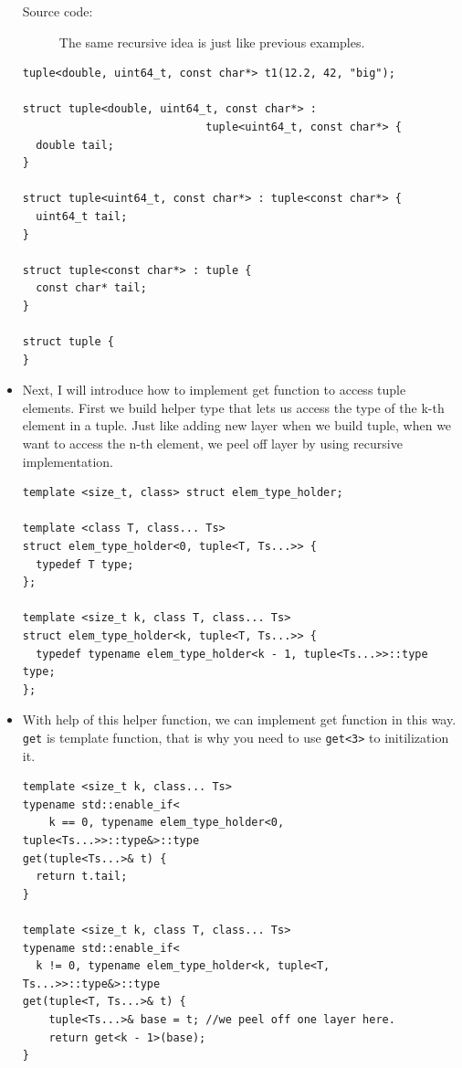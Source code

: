 \documentclass[a4paper,11pt,twoside]{book}
\begin{document}
\begin{itemize}
\begin{description}
	\item[Source code:] The same recursive idea is just like previous examples.
\end{description}

\begin{lstlisting}
tuple<double, uint64_t, const char*> t1(12.2, 42, "big");

struct tuple<double, uint64_t, const char*> : 
							tuple<uint64_t, const char*> {
  double tail;
}

struct tuple<uint64_t, const char*> : tuple<const char*> {
  uint64_t tail;
}

struct tuple<const char*> : tuple {
  const char* tail;
}

struct tuple {
}
\end{lstlisting}

    \item Next, I will introduce how to implement get function to access tuple elements. First we build helper type that lets us access the type of the k-th element in a tuple. Just like adding new layer when we build tuple, when we want to access the n-th element, we peel off layer by using recursive implementation.

\begin{lstlisting}
template <size_t, class> struct elem_type_holder;

template <class T, class... Ts>
struct elem_type_holder<0, tuple<T, Ts...>> {
  typedef T type;
};

template <size_t k, class T, class... Ts>
struct elem_type_holder<k, tuple<T, Ts...>> {
  typedef typename elem_type_holder<k - 1, tuple<Ts...>>::type type;
};
\end{lstlisting}
    \item With help of this helper function, we can implement get function in this way. \texttt{get} is template function, that is why you need to use \texttt{get<3>} to initilization it. 
\begin{lstlisting}
template <size_t k, class... Ts>
typename std::enable_if<
    k == 0, typename elem_type_holder<0, tuple<Ts...>>::type&>::type
get(tuple<Ts...>& t) {
  return t.tail;
}

template <size_t k, class T, class... Ts>
typename std::enable_if<
  k != 0, typename elem_type_holder<k, tuple<T, Ts...>>::type&>::type
get(tuple<T, Ts...>& t) {
    tuple<Ts...>& base = t; //we peel off one layer here. 
    return get<k - 1>(base);
}
\end{lstlisting}


\end{itemize}
\end{document}
